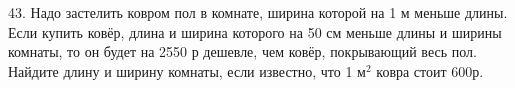 43. Надо застелить ковром пол в комнате, ширина которой на 1 м меньше длины. Если купить ковёр, длина и ширина которого на 50 см меньше длины и ширины комнаты, то он будет на 2550 р дешевле, чем ковёр, покрывающий весь пол. Найдите длину и ширину комнаты, если известно, что 1 $\text{м}^2$ ковра стоит 600р.\\
